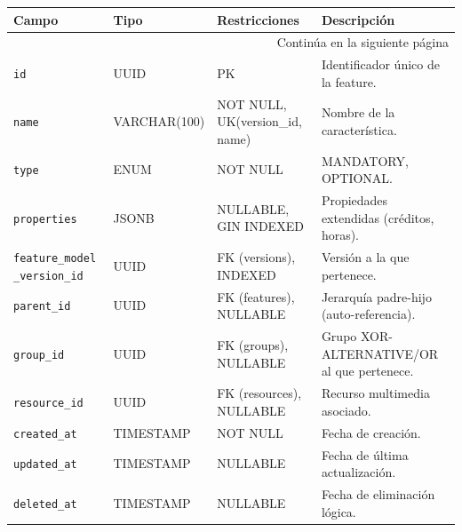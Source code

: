 {{{\begin{longtable}{|p{}|p{}|p{}|p{}|}
                \hline
                \rowcolor[HTML]{CBCEFB} 
                \textbf{Campo} & \textbf{Tipo} & \textbf{Restricciones} & \textbf{Descripción} \\
                \hline
                \endhead
                
                \hline
                \multicolumn{4}{|r|}{{Continúa en la siguiente página}} \\
                \endfoot
                
                \hline
                \endlastfoot

                \texttt{id} & UUID & PK & Identificador único de la feature. \\
                \hline
                \rowcolor[HTML]{EDEBF1}
                \texttt{name} & VARCHAR(100) & NOT NULL, UK(version\_id, name) & Nombre de la característica. \\
                \hline
                \texttt{type} & ENUM & NOT NULL & MANDATORY, OPTIONAL. \\
                \hline
                \rowcolor[HTML]{EDEBF1}
                \texttt{properties} & JSONB & NULLABLE, GIN INDEXED & Propiedades extendidas (créditos, horas). \\
                \hline
                \texttt{feature\_model 
                \_version\_id} & UUID & FK (versions), INDEXED & Versión a la que pertenece. \\
                \hline
                \rowcolor[HTML]{EDEBF1}
                \texttt{parent\_id} & UUID & FK (features), NULLABLE & Jerarquía padre-hijo (auto-referencia). \\
                \hline
                \texttt{group\_id} & UUID & FK (groups), NULLABLE & Grupo XOR-ALTERNATIVE/OR al que pertenece. \\
                \hline
                \rowcolor[HTML]{EDEBF1}
                \texttt{resource\_id} & UUID & FK (resources), NULLABLE & Recurso multimedia asociado. \\
                \hline
                \texttt{created\_at} & TIMESTAMP & NOT NULL & Fecha de creación. \\
                \hline
                \rowcolor[HTML]{EDEBF1}
                \texttt{updated\_at} & TIMESTAMP & NULLABLE & Fecha de última actualización. \\
                \hline
                \texttt{deleted\_at} & TIMESTAMP & NULLABLE & Fecha de eliminación lógica. \\

\end{longtable}}}}

